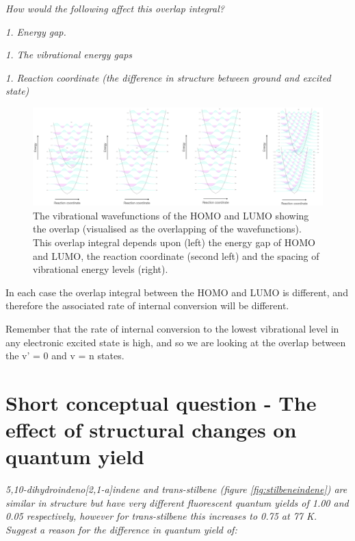 \documentclass[
]{book}
\begin{document}
\emph{How would the following affect this overlap integral?}

\emph{1. Energy gap.}

\emph{1. The vibrational energy gaps}

\emph{1. Reaction coordinate (the difference in structure between ground and excited state)}

\begin{figure}

{\centering \includegraphics[width=1\linewidth]{images/intconvoverlap2} 

}

\caption{The vibrational wavefunctions of the HOMO and LUMO showing the overlap (visualised as the overlapping of the wavefunctions). This overlap integral depends upon (left) the energy gap of HOMO and LUMO, the reaction coordinate (second left) and the spacing of vibrational energy levels (right).}\label{fig:overlapans}
\end{figure}

In each case the overlap integral between the HOMO and LUMO is different, and therefore the associated rate of internal conversion will be different.

Remember that the rate of internal conversion to the lowest vibrational level in any electronic excited state is high, and so we are looking at the overlap between the v' = 0 and v = n states.

\hypertarget{sec:structureQY}{%
\section{Short conceptual question - The effect of structural changes on quantum yield}\label{sec:structureQY}}

\emph{5,10-dihydroindeno{[}2,1-a{]}indene and trans-stilbene (figure \ref{fig:stilbeneindene}) are similar in structure but have very different fluorescent quantum yields of 1.00 and 0.05 respectively, however for trans-stilbene this increases to 0.75 at 77 K. Suggest a reason for the difference in quantum yield of:}
\end{document}
